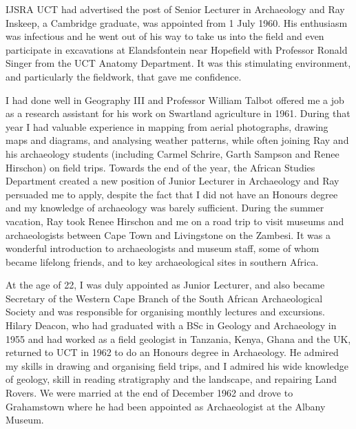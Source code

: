 \begin{labeling}{IJSRA}
UCT had advertised the post of Senior Lecturer in Archaeology and Ray Inskeep, a Cambridge graduate, was appointed from 1 July 1960. His enthusiasm was infectious and he went out of his way to take us into the field and even participate in excavations at Elandsfontein near Hopefield with Professor Ronald Singer from the UCT Anatomy Department. It was this stimulating environment, and particularly the fieldwork, that gave me confidence.  

I had done well in Geography III and Professor William Talbot offered me a job as a research assistant for his work on Swartland agriculture in 1961. During that year I had valuable experience in mapping from aerial photographs, drawing maps and diagrams, and analysing weather patterns, while often joining Ray and his archaeology students (including Carmel Schrire, Garth Sampson and Renee Hirschon) on field trips. Towards the end of the year, the African Studies Department created a new position of Junior Lecturer in Archaeology and Ray persuaded me to apply, despite the fact that I did not have an Honours degree and my knowledge of archaeology was barely sufficient. During the summer vacation, Ray took Renee Hirschon and me on a road trip to visit museums and archaeologists between Cape Town and Livingstone on the Zambesi. It was a wonderful introduction to archaeologists and museum staff, some of whom became lifelong friends, and to key archaeological sites in southern Africa.

At the age of 22, I was duly appointed as Junior Lecturer, and also became Secretary of the Western Cape Branch of the South African Archaeological Society and was responsible for organising monthly lectures and excursions. Hilary Deacon, who had graduated with a BSc in Geology and Archaeology in 1955 and had worked as a field geologist in Tanzania, Kenya, Ghana and the UK, returned to UCT in 1962 to do an Honours degree in Archaeology. He admired my skills in drawing and organising field trips, and I admired his wide knowledge of geology, skill in reading stratigraphy and the landscape, and repairing Land Rovers. We were married at the end of December 1962 and drove to Grahamstown where he had been appointed as Archaeologist at the Albany Museum.


\end{labeling}
